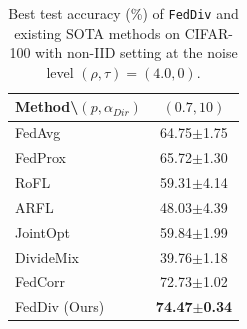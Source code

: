 \documentclass[letterpaper]{article} %
\begin{document}
\begin{table}[t]
    \centering
    \tiny
    \begin{tabular}{l|c}
        \toprule
        \midrule
        \textbf{Method}\textbackslash $(p, \alpha_{Dir})$ & $(0.7, 10)$ \\
        \midrule
        FedAvg~\cite{FedAvg}             & 64.75$\pm$1.75          \\
        FedProx~\cite{FedProx}           & 65.72$\pm$1.30          \\
        RoFL~\cite{RoFL}                 & 59.31$\pm$4.14          \\
        ARFL~\cite{ARFL}                 & 48.03$\pm$4.39          \\
        JointOpt~\cite{JointOpt}         & 59.84$\pm$1.99          \\
        DivideMix~\cite{li2019dividemix} & 39.76$\pm$1.18          \\
        FedCorr~\cite{xu2022fedcorr}     & 72.73$\pm$1.02          \\
        FedDiv (Ours)                    & \textbf{74.47$\pm$0.34} \\
        \bottomrule
    \end{tabular}%
    \caption{Best test accuracy (\%) of \texttt{FedDiv} and existing SOTA methods on CIFAR-100 with non-IID setting at the noise level $(\rho, \tau)=(4.0, 0)$.}
    \label{Table:CIFAR100-NonIID}%
\end{table}%


\begin{table}[t]
    \centering
    \caption{Best test accuracy (\%) of \texttt{FedDiv} and existing SOTA methods on Clothing1M with non-IID setting.}
    \label{Table:Clothing-1M}%

\end{table}%
\end{document}
